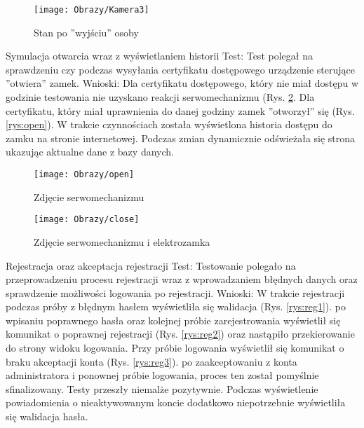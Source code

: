 \begin{enumerate*}
	\begin{figure}[ht!]
		\vspace{-1.7cm}
		\centering
		\texttt{[image: Obrazy/Kamera3]}
		\caption{Stan po ''wyjściu'' osoby}
		\label{rys:Kamera3}
	\end{figure}
\newpage
	\item Symulacja otwarcia wraz z wyświetlaniem historii \newline
	Test: Test polegał na sprawdzeniu czy podczas wysyłania certyfikatu dostępowego urządzenie sterujące ''otwiera'' zamek. \newline
	Wnioski: Dla certyfikatu dostępowego, który nie miał dostępu w godzinie testowania nie uzyskano reakcji serwomechanizmu (Rys. \ref{rys:close}. Dla certyfikatu, który miał uprawnienia do danej godziny zamek ''otworzył'' się (Rys. \ref{rys:open}). W trakcie  czynnościach została wyświetlona historia dostępu do zamku na stronie internetowej. Podczas zmian dynamicznie odświeżała się strona ukazując aktualne dane z bazy danych. 
		\begin{figure}[ht!]
		\centering
		\begin{minipage}{0.5\textwidth}
			\texttt{[image: Obrazy/open]}
			\caption{Zdjęcie serwomechanizmu }
			\label{rys:open}
		\end{minipage}
	\begin{minipage}{0.5\textwidth}
		\texttt{[image: Obrazy/close]}
		\caption{Zdjęcie serwomechanizmu i elektrozamka }
		\label{rys:close}
	\end{minipage}
	\end{figure}

	\item Rejestracja oraz akceptacja rejestracji \newline
	Test: Testowanie polegało na przeprowadzeniu procesu rejestracji wraz z wprowadzaniem błędnych danych oraz sprawdzenie możliwości logowania po rejestracji. \newline
	Wnioski: W trakcie rejestracji podczas próby z błędnym hasłem wyświetliła się walidacja (Rys. \ref{rys:reg1}). po wpisaniu poprawnego hasła oraz kolejnej próbie zarejestrowania wyświetlił się komunikat o poprawnej rejestracji (Rys. \ref{rys:reg2}) oraz nastąpiło przekierowanie do strony widoku logowania. Przy próbie logowania wyświetlił się komunikat o braku akceptacji konta (Rys. \ref{rys:reg3}). po zaakceptowaniu z konta administratora i ponownej próbie logowania, proces ten został pomyślnie sfinalizowany. Testy przeszły niemalże pozytywnie. Podczas wyświetlenie powiadomienia o nieaktywowanym koncie dodatkowo niepotrzebnie wyświetliła się walidacja hasła.   
	

\end{enumerate*}
